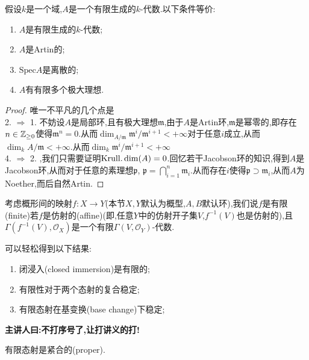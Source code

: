 \begin{definition-proposition}
    假设$k$是一个域,$A$是一个有限生成的$k$-代数.以下条件等价:
    \begin{enumerate}
        \item $A$是有限生成的$k$-代数;
        \item $A$是Artin的;
        \item $\text{Spec} A$是离散的;
        \item $A$有有限多个极大理想.
    \end{enumerate}
\end{definition-proposition}
\begin{proof}
唯一不平凡的几个点是\\
2. $\Rightarrow$ 1. 不妨设$A$是局部环,且有极大理想$\mathfrak{m}$,由于$A$是Artin环,$\mathfrak{m}$是幂零的,即存在$n\in \mathbb{Z}_{\geq 0}$使得$\mathfrak{m}^n = 0$.从而$\dim_{A/\mathfrak{m}}\mathfrak{m}^i/\mathfrak{m}^{i+1} < +\infty$对于任意$i$成立,从而$\dim_k A/\mathfrak{m}<+\infty$.从而$\dim_k \mathfrak{m}^i/\mathfrak{m}^{i+1}<+\infty$\\
4. $\Rightarrow$ 2. ,我们只需要证明$\operatorname{Krull.dim}(A) = 0$.回忆若干Jacobson环的知识,得到$A$是Jacobson环,从而对于任意的素理想$\mathfrak{p}$, $\mathfrak{p} = \bigcap_{i=1}^n \mathfrak{m}_i$.从而存在$i$使得$\mathfrak{p}\supset \mathfrak{m}_i$,从而$A$为Noether,而后自然Artin.

\end{proof}
\begin{definition}
考虑概形间的映射$f :X \to Y$(本节$X,Y$默认为概型,$A,B$默认环),我们说$f$是有限(finite)若$f$是仿射的(affine)(即,任意$Y$中的仿射开子集$V$,$f^{-1}(V)$也是仿射的),且$\Gamma(f^{-1}(V),\mathcal{O}_X)$是一个有限$\Gamma(V,\mathcal{O}_Y)$-代数.
\end{definition}
\begin{proposition}\label{Pro:Finiteness}
可以轻松得到以下结果:
    \begin{enumerate}
        \item 闭浸入(closed immersion)是有限的;
        \item 有限性对于两个态射的复合稳定;
        \item 有限态射在基变换(base change)下稳定;
        
    \end{enumerate}
\end{proposition}
\begin{remark}
    \textbf{主讲人曰:不打序号了,让打讲义的打!}
\end{remark}
\begin{proposition}
        有限态射是紧合的(proper).
\end{proposition}
